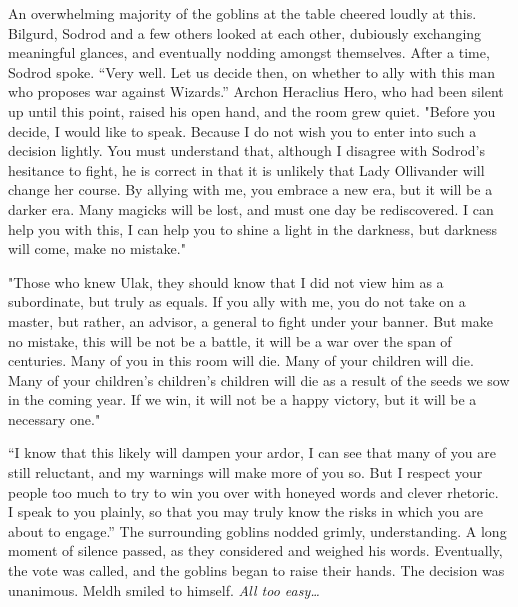 An overwhelming majority of the goblins at the table cheered loudly at this. Bilgurd, Sodrod and a few others looked at each other, dubiously exchanging meaningful glances, and eventually nodding amongst themselves.
\SomeVSpace
After a time, Sodrod spoke. “Very well. Let us decide then, on whether to ally with this man who proposes war against Wizards.”
\SmallVSpace
Archon Heraclius Hero, who had been silent up until this point, raised his open hand, and the room grew quiet. "Before you decide, I would like to speak. Because I do not wish you to enter into such a decision lightly. You must understand that, although I disagree with Sodrod’s hesitance to fight, he is correct in that it is unlikely that Lady Ollivander will change her course. By allying with me, you embrace a new era, but it will be a darker era. Many magicks will be lost, and must one day be rediscovered. I can help you with this, I can help you to shine a light in the darkness, but darkness will come, make no mistake."

"Those who knew Ulak, they should know that I did not view him as a subordinate, but truly as equals. If you ally with me, you do not take on a master, but rather, an advisor, a general to fight under your banner. But make no mistake, this will be not be a battle, it will be a war over the span of centuries. Many of you in this room will die. Many of your children will die. Many of your children’s children’s children will die as a result of the seeds we sow in the coming year. If we win, it will not be a happy victory, but it will be a necessary one."

“I know that this likely will dampen your ardor, I can see that many of you are still reluctant, and my warnings will make more of you so. But I respect your people too much to try to win you over with honeyed words and clever rhetoric.\\I speak to you plainly, so that you may truly know the risks in which you are about to engage.”
\SmallVSpace
The surrounding goblins nodded grimly, understanding. A long moment of silence passed, as they considered and weighed his words. Eventually, the vote was called, and the goblins began to raise their hands. The decision was unanimous.
\SomeVSpace
Meldh smiled to himself.
\SmallVSpace
\emph{All too easy…}
